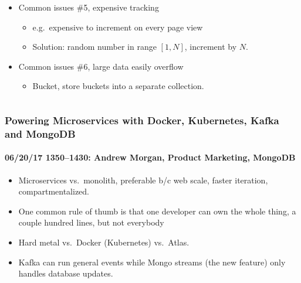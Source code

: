 \documentclass[xcolor=dvipsnames, 9pt]{beamer}
\begin{document}
\begin{frame}
\begin{columns}
\begin{column}{0.5\textwidth}
\begin{itemize}
                \item Common issues \#5, expensive tracking
                    \begin{itemize}
                        \item e.g.\ expensive to increment on every page view
                        \item Solution: random number in range $[1, N]$,
                            increment by $N$.
                    \end{itemize}
                \item Common issues \#6, large data easily overflow
                    \begin{itemize}
                        \item Bucket, store buckets into a separate
                            collection.
                    \end{itemize}
            \end{itemize}
        \end{column}
    \end{columns}
\end{frame}

\begin{frame}
    \frametitle{Powering Microservices with Docker, Kubernetes, Kafka and MongoDB}
    \framesubtitle{%
        06/20/17 1350--1430:
        Andrew Morgan, Product Marketing, MongoDB
    }
    \begin{itemize}
        \item Microservices vs.\ monolith, preferable b/c web scale,
            faster iteration, compartmentalized.
        \item One common rule of thumb is that one developer can own the
            whole thing, a couple hundred lines, but not everybody
        \item Hard metal vs.\ Docker (Kubernetes) vs.\ Atlas.
        \item Kafka can run general events while Mongo streams (the new feature)
            only handles database updates.
    \end{itemize}
\end{frame}
\end{document}
